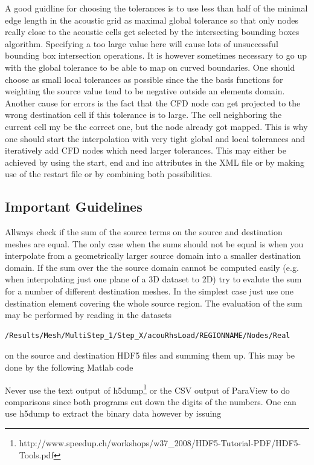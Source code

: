 \documentclass[a4paper,10pt]{article}
\begin{document}
\noindent A good guidline for choosing the tolerances is to use less than half
of the minimal edge length in the acoustic grid as maximal global tolerance so
that  only nodes  really  close to  the  acoustic cells  get  selected by  the
intersecting bounding boxes algorithm. Specifying  a too large value here will
cause lots of unsuccessful bounding box intersection operations. It is however
sometimes necessary to  go up with the  global tolerance to be able  to map on
curved boundaries.   One should choose  as small local tolerances  as possible
since  the the  basis functions  for  weighting the  source value  tend to  be
negative outside an elements domain. Another cause for errors is the fact that
the CFD node can get projected to the wrong destination cell if this tolerance
is to large. The cell neighboring the  current cell my be the correct one, but
the node  already got mapped. This  is why one should  start the interpolation
with  very tight global  and local  tolerances and  iteratively add  CFD nodes
which need larger tolerances. This may  either be achieved by using the start,
end and inc attributes in the XML file or by making use of the restart file or
by combining both possibilities.

\subsection{Important Guidelines}

Allways check  if the sum  of the source  terms on the source  and destination
meshes are equal. The only case when  the sums should not be equal is when you
interpolate  from  a  geometrically   larger  source  domain  into  a  smaller
destination domain. If  the sum over the the source  domain cannot be computed
easily (e.g. when interpolating  just one plane of a 3D dataset  to 2D) try to
evalute the sum for a number  of different destination meshes. In the simplest
case just use one destination element covering the whole source region.
The evaluation of the sum may be performed by reading in the datasets
\begin{verbatim}
/Results/Mesh/MultiStep_1/Step_X/acouRhsLoad/REGIONNAME/Nodes/Real
\end{verbatim}
on the source and destination HDF5 files and summing them up. This may be done
by the following Matlab code


\noindent      Never     use      the     text      output      of     h5dump\footnote{http://www.speedup.ch/workshops/w37\_2008/HDF5-Tutorial-PDF/HDF5-Tools.pdf}
or the CSV  output of ParaView to do comparisons since  both programs cut down
the  digits of the  numbers. One  can use  h5dump to  extract the  binary data
however by issuing
\end{document}
